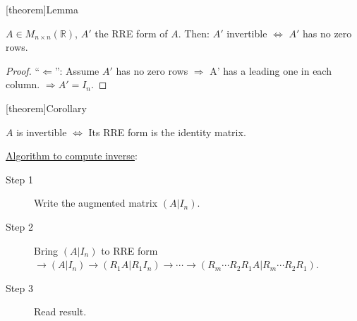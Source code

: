 \documentclass[12pt]{report}
\theoremstyle{definition}
\begin{document}
[theorem]{Lemma}
\begin{invertible A'}
    $A\in M_{n\times n}(\mathbb{R})$, $A'$ the RRE form of $A$. Then:
    $A'$ invertible $\iff$ $A'$ has no zero rows.
\end{invertible A'}

\begin{proof}
    ``$\Leftarrow$'': Assume $A'$ has no zero rows $\Rightarrow{}$ A' has a leading one in each column.
    $\Rightarrow{}A' = I_n$.
\end{proof}

[theorem]{Corollary}
\begin{invertible matrix is identity itself}
    $A$ is invertible $\iff$ Its RRE form is the identity matrix.
\end{invertible matrix is identity itself}

\underline{Algorithm to compute inverse}:

\begin{description}
    \item[Step 1] Write the augmented matrix $(A|I_n)$.
    \item[Step 2] Bring $(A|I_n)$ to RRE form
        $\rightarrow{}(A|I_n)\rightarrow{}(R_1A|R_1 I_n)\rightarrow{}\cdots
        \rightarrow{}(R_m\cdots R_2 R_1 A|R_m\cdots R_2 R_1)$.
    \item[Step 3] Read result.
\end{description}
\end{document}
